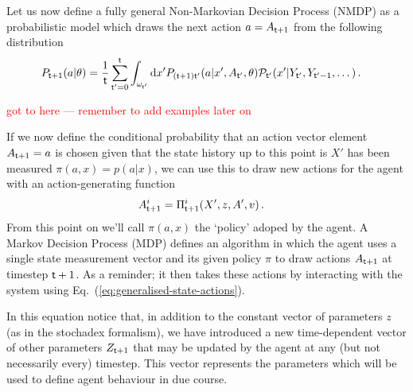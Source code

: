 Let us now define a fully general Non-Markovian Decision Process (NMDP) as a probabilistic model which draws the next action $a=A_{{\sf t}+1}$ from the following distribution
\begin{align}
P_{{\sf t}+1}(a\vert \theta) &= \frac{1}{{\sf t}}\sum_{{\sf t}'=0}^{{\sf t}}\int_{\omega_{{\sf t}'}} {\rm d}x'P_{({\sf t}+1){\sf t}'}(a\vert x',A_{{\sf t}'},\theta){\cal P}_{{\sf t}'}(x'\vert Y_{{\sf t}'}, Y_{{\sf t}'-1}, \dots) \,.
\end{align}

\textcolor{red}{
got to here --- remember to add examples later on
}

If we now define the conditional probability that an action vector element $A_{{\sf t}+1}=a$ is chosen given that the state history up to this point is $X'$ has been measured $\pi (a,x) = p(a\vert x)$, we can use this to draw new actions for the agent with an action-generating function
\begin{align}
A_{{\sf t}+1}^i &= \Pi_{{\sf t}+1}^i(X', z, A', v) \label{eq:action-generating-function} \,.
\end{align}
From this point on we'll call $\pi (a,x)$ the `policy' adoped by the agent. A Markov Decision Process (MDP) defines an algorithm in which the agent uses a single state measurement vector and its given policy $\pi$ to draw actions $A_{{\sf t}+1}$ at timestep ${{\sf t}+1}$. As a reminder; it then takes these actions by interacting with the system using Eq.~(\ref{eq:generalised-state-actions}).

In this equation notice that, in addition to the constant vector of parameters $z$ (as in the stochadex formalism), we have introduced a new time-dependent vector of other parameters $Z_{{\sf t}+1}$ that may be updated by the agent at any (but not necessarily every) timestep. This vector represents the parameters which will be used to define agent behaviour in due course.